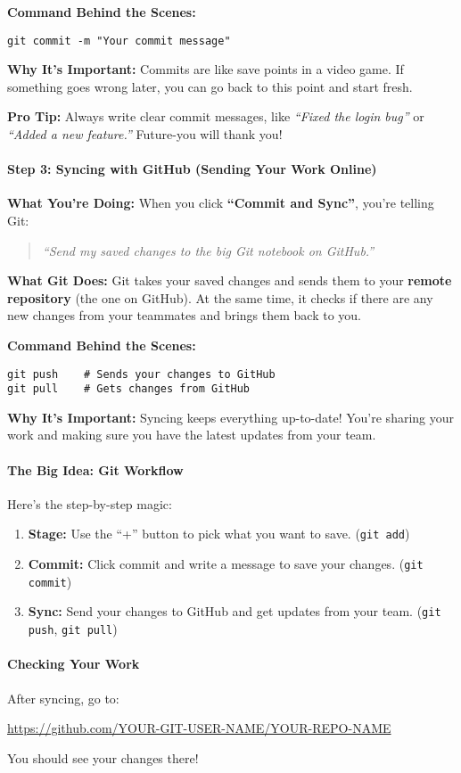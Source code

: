 \documentclass{ximera}
\begin{document}
\begin{multicols}{2}
    \textbf{Command Behind the Scenes:}
    \begin{verbatim}
git commit -m "Your commit message"
\end{verbatim}

    \textbf{Why It's Important:}
    Commits are like save points in a video game. If something goes wrong later,
    you can go back to this point and start fresh.

    \textbf{Pro Tip:}
    Always write clear commit messages, like \emph{``Fixed the login bug''} or
    \emph{``Added a new feature.''} Future-you will thank you!

    \paragraph{Step 3: Syncing with GitHub (Sending Your Work Online)}

    \textbf{What You're Doing:}
    When you click \textbf{``Commit and Sync''}, you're telling Git:
    \begin{quote}
        \emph{``Send my saved changes to the big Git notebook on GitHub.''}
    \end{quote}

    \textbf{What Git Does:}
    Git takes your saved changes and sends them to your \textbf{remote repository}
    (the one on GitHub). At the same time, it checks if there are any new changes
    from your teammates and brings them back to you.

    \textbf{Command Behind the Scenes:}
    \begin{verbatim}
git push    # Sends your changes to GitHub
git pull    # Gets changes from GitHub
\end{verbatim}

    \textbf{Why It's Important:}
    Syncing keeps everything up-to-date! You're sharing your work and making sure
    you have the latest updates from your team.

    \paragraph{The Big Idea: Git Workflow}

    Here's the step-by-step magic:
    \begin{enumerate}
        \item \textbf{Stage:} Use the ``+'' button to pick what you want to save.
              (\texttt{git add})
        \item \textbf{Commit:} Click commit and write a message to save your
              changes. (\texttt{git commit})
        \item \textbf{Sync:} Send your changes to GitHub and get updates from your
              team. (\texttt{git push}, \texttt{git pull})
    \end{enumerate}

    \paragraph{Checking Your Work}

    After syncing, go to:
    \begin{center}
        \url{https://github.com/YOUR-GIT-USER-NAME/YOUR-REPO-NAME}
    \end{center}
    You should see your changes there!
\end{multicols}
\twocolumn
\end{document}
